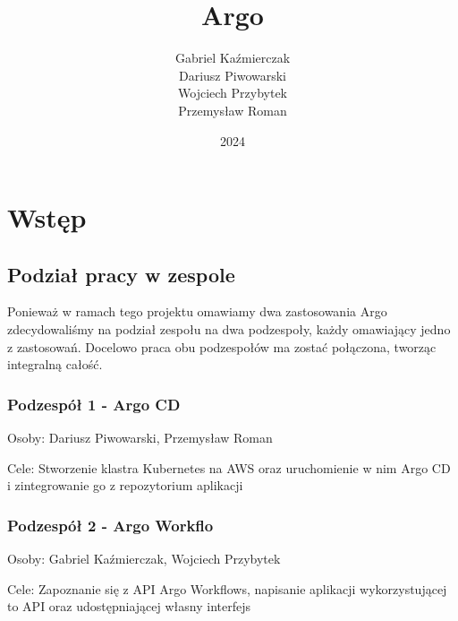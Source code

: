 \documentclass{article}
\title{\textbf{Argo}}
\author{Gabriel Kaźmierczak\\ Dariusz Piwowarski\\ Wojciech Przybytek\\ Przemysław Roman}
\date{2024}
\begin{document}
\begin{titlingpage}
\maketitle
\end{titlingpage}


\newpage
\tableofcontents


\newpage
\section{Wstęp}

\subsection*{Podział pracy w zespole}
Ponieważ w ramach tego projektu omawiamy dwa zastosowania Argo zdecydowaliśmy na podział zespołu na dwa podzespoły, każdy omawiający jedno z zastosowań.
Docelowo praca obu podzespołów ma zostać połączona, tworząc integralną całość.

\subsubsection*{Podzespół 1 - Argo CD}
Osoby: Dariusz Piwowarski, Przemysław Roman

Cele: Stworzenie klastra Kubernetes na AWS oraz uruchomienie w nim Argo CD i zintegrowanie go z repozytorium aplikacji

\subsubsection*{Podzespół 2 - Argo Workflo}
Osoby: Gabriel Kaźmierczak, Wojciech Przybytek

Cele: Zapoznanie się z API Argo Workflows, napisanie aplikacji wykorzystującej to API oraz udostępniającej własny interfejs


\newpage
\end{document}
